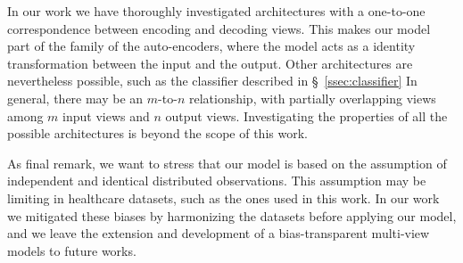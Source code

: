 In our work we have thoroughly investigated architectures with a one-to-one correspondence between encoding and decoding views.
This makes our model part of the family of the auto-encoders, where the model acts as a identity transformation between the input and the output.
Other architectures are nevertheless possible, such as the classifier described in \S~\ref{ssec:classifier}
In general, there may be an $m$-to-$n$ relationship, with partially overlapping views among $m$ input views and $n$ output views.
Investigating the properties of all the possible architectures is beyond the scope of this work.

As final remark, we want to stress that our model is based on the assumption of independent and identical distributed observations.
This assumption may be limiting in healthcare datasets, such as the ones used in this work.
In our work we mitigated these biases by harmonizing the datasets before applying our model, and we leave the extension and development of a bias-transparent multi-view models to future works.

